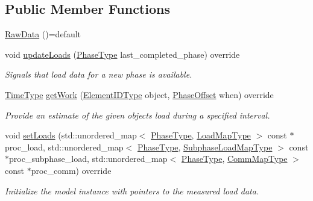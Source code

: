\subsection*{Public Member Functions}
\begin{DoxyCompactItemize}
\item 
\hyperlink{structvt_1_1vrt_1_1collection_1_1balance_1_1_raw_data_a4879ed47b7d3da3008dc6199adc6d519}{Raw\+Data} ()=default
\item 
void \hyperlink{structvt_1_1vrt_1_1collection_1_1balance_1_1_raw_data_a4aaae24a53ead0248b873911ce560a34}{update\+Loads} (\hyperlink{namespacevt_a46ce6733d5cdbd735d561b7b4029f6d7}{Phase\+Type} last\+\_\+completed\+\_\+phase) override
\begin{DoxyCompactList}\small\item\em Signals that load data for a new phase is available. \end{DoxyCompactList}\item 
\hyperlink{namespacevt_a876a9d0cd5a952859c72de8a46881442}{Time\+Type} \hyperlink{structvt_1_1vrt_1_1collection_1_1balance_1_1_raw_data_abb4ce5d944f229b411d9a3b61f370822}{get\+Work} (\hyperlink{namespacevt_1_1vrt_1_1collection_1_1balance_a14c8d2c972f2913aa3f1636e5be0a120}{Element\+I\+D\+Type} object, \hyperlink{structvt_1_1vrt_1_1collection_1_1balance_1_1_phase_offset}{Phase\+Offset} when) override
\begin{DoxyCompactList}\small\item\em Provide an estimate of the given object\textquotesingle{}s load during a specified interval. \end{DoxyCompactList}\item 
void \hyperlink{structvt_1_1vrt_1_1collection_1_1balance_1_1_raw_data_a782bcf1ecfd0a88ded3e98c83f08cc6f}{set\+Loads} (std\+::unordered\+\_\+map$<$ \hyperlink{namespacevt_a46ce6733d5cdbd735d561b7b4029f6d7}{Phase\+Type}, \hyperlink{namespacevt_1_1vrt_1_1collection_1_1balance_a45306ee4bf38fe3fb586d1ee2fa3d147}{Load\+Map\+Type} $>$ const $\ast$proc\+\_\+load, std\+::unordered\+\_\+map$<$ \hyperlink{namespacevt_a46ce6733d5cdbd735d561b7b4029f6d7}{Phase\+Type}, \hyperlink{namespacevt_1_1vrt_1_1collection_1_1balance_a3d91523158c1025b7b665240072f3b7e}{Subphase\+Load\+Map\+Type} $>$ const $\ast$proc\+\_\+subphase\+\_\+load, std\+::unordered\+\_\+map$<$ \hyperlink{namespacevt_a46ce6733d5cdbd735d561b7b4029f6d7}{Phase\+Type}, \hyperlink{namespacevt_1_1vrt_1_1collection_1_1balance_a10860c956804d644db54a16012352728}{Comm\+Map\+Type} $>$ const $\ast$proc\+\_\+comm) override
\begin{DoxyCompactList}\small\item\em Initialize the model instance with pointers to the measured load data. \end{DoxyCompactList}\item 

\end{DoxyCompactItemize}
